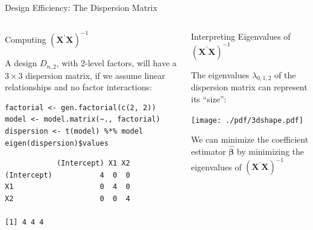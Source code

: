 \documentclass[10pt, compress, aspectratio=169, xcolor={table,usenames,dvipsnames}]{beamer}
\begin{document}
\begin{frame}[fragile,label={sec:org46e4e26}]{Design Efficiency: The Dispersion Matrix}
 \addtocounter{framenumber}{-1}
\begin{columns}
\begin{column}{0.5\columnwidth}
\begin{block}{Computing \(\left(\bm{X}^{\prime}\bm{X}\right)^{-1}\)}
\vspace{.2cm}

A design \(D_{n,2}\), with \alert{2-level factors}, will have a \(3\times3\)
\alert{dispersion matrix}, if we assume \alert{linear relationships} and no \alert{factor
interactions}:

\vspace{.2cm}

\scriptsize

\lstset{language=r,label= ,caption= ,captionpos=b,numbers=none}
\begin{lstlisting}
factorial <- gen.factorial(c(2, 2))
model <- model.matrix(~., factorial)
dispersion <- t(model) %*% model
eigen(dispersion)$values
\end{lstlisting}

\vspace{-.4cm}

\begin{verbatim}
            (Intercept) X1 X2
(Intercept)           4  0  0
X1                    0  4  0
X2                    0  0  4

[1] 4 4 4
\end{verbatim}

\normalsize
\end{block}
\end{column}

\begin{column}{0.5\columnwidth}
\begin{block}{Interpreting Eigenvalues of \(\left(\bm{X}^{\prime}\bm{X}\right)^{-1}\)}
\vspace{.1cm}

The \alert{eigenvalues} \(\lambda_{0,1,2}\) of the \alert{dispersion matrix} can
represent its \alert{``size''}:

\vspace{-.3cm}

\begin{center}
\texttt{[image: ./pdf/3dshape.pdf]}
\end{center}

\vspace{-.3cm}

We can \alert{minimize the coefficient estimator} \(\bm{\hat{\beta}}\) by
\alert{minimizing the eigenvalues} of \(\left(\bm{X}^{\prime}\bm{X}\right)^{-1}\)
\end{block}
\end{column}
\end{columns}
\end{frame}
\end{document}
